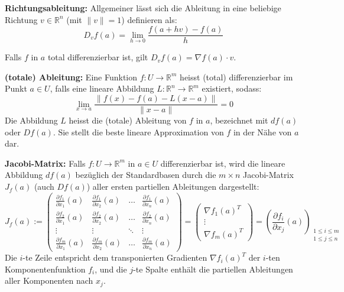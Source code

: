 \begin{definition}
    \textbf{Richtungsableitung:} Allgemeiner lässt sich die Ableitung in eine beliebige Richtung $v \in \mathbb{R}^n$ (mit $\|v\|=1$) definieren als:
    $$ D_v f(a) = \lim_{h \to 0} \frac{f(a + h v) - f(a)}{h} $$
\end{definition}

\begin{remark}
    Falls $f$ in $a$ total differenzierbar ist, gilt $D_v f(a) = \nabla f(a) \cdot v$.
\end{remark}    

\begin{definition}
    \textbf{(totale) Ableitung:} Eine Funktion $f: U \to \mathbb{R}^m$ heisst (total) differenzierbar im Punkt $a \in U$, falls eine lineare Abbildung $L: \mathbb{R}^n \to \mathbb{R}^m$ existiert, sodass:
    $$ \lim_{x \to a} \frac{\|f(x) - f(a) - L(x - a)\|}{\|x - a\|} = 0 $$
    Die Abbildung $L$ heisst die (totale) Ableitung von $f$ in $a$, bezeichnet mit $df(a)$ oder $Df(a)$. Sie stellt die beste lineare Approximation von $f$ in der Nähe von $a$ dar.
\end{definition}

\begin{definition}
    \textbf{Jacobi-Matrix:} Falls $f: U \to \mathbb{R}^m$ in $a \in U$ differenzierbar ist, wird die lineare Abbildung $df(a)$ bezüglich der Standardbasen durch die $m \times n$ Jacobi-Matrix $J_f(a)$ (auch $Df(a)$) aller ersten partiellen Ableitungen dargestellt:
    $$ J_f(a) := \begin{pmatrix}
    \frac{\partial f_1}{\partial x_1}(a) & \frac{\partial f_1}{\partial x_2}(a) & \dots & \frac{\partial f_1}{\partial x_n}(a) \\
    \frac{\partial f_2}{\partial x_1}(a) & \frac{\partial f_2}{\partial x_2}(a) & \dots & \frac{\partial f_2}{\partial x_n}(a) \\
    \vdots & \vdots & \ddots & \vdots \\
    \frac{\partial f_m}{\partial x_1}(a) & \frac{\partial f_m}{\partial x_2}(a) & \dots & \frac{\partial f_m}{\partial x_n}(a)
    \end{pmatrix} = \begin{pmatrix} \nabla f_1(a)^T \\ \vdots \\ \nabla f_m(a)^T \end{pmatrix} = \left( \frac{\partial f_i}{\partial x_j}(a) \right)_{\substack{1 \le i \le m \\ 1 \le j \le n}} $$
    Die $i$-te Zeile entspricht dem transponierten Gradienten $\nabla f_i(a)^T$ der $i$-ten Komponentenfunktion $f_i$, und die $j$-te Spalte enthält die partiellen Ableitungen aller Komponenten nach $x_j$.
\end{definition}


